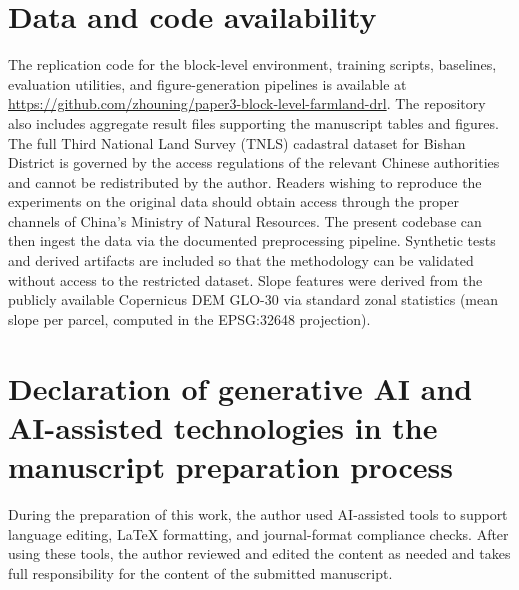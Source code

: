 \documentclass[preprint,12pt]{elsarticle}
\begin{document}
\section*{Data and code availability}
The replication code for the block-level environment, training scripts, baselines, evaluation utilities, and figure-generation pipelines is available at \url{https://github.com/zhouning/paper3-block-level-farmland-drl}. The repository also includes aggregate result files supporting the manuscript tables and figures. The full Third National Land Survey (TNLS) cadastral dataset for Bishan District is governed by the access regulations of the relevant Chinese authorities and cannot be redistributed by the author. Readers wishing to reproduce the experiments on the original data should obtain access through the proper channels of China's Ministry of Natural Resources. The present codebase can then ingest the data via the documented preprocessing pipeline. Synthetic tests and derived artifacts are included so that the methodology can be validated without access to the restricted dataset. Slope features were derived from the publicly available Copernicus DEM GLO-30 \citep{copernicus2021dem} via standard zonal statistics (mean slope per parcel, computed in the EPSG:32648 projection).

\section*{Declaration of generative AI and AI-assisted technologies in the manuscript preparation process}
During the preparation of this work, the author used AI-assisted tools to support language editing, LaTeX formatting, and journal-format compliance checks. After using these tools, the author reviewed and edited the content as needed and takes full responsibility for the content of the submitted manuscript.


\end{document}
